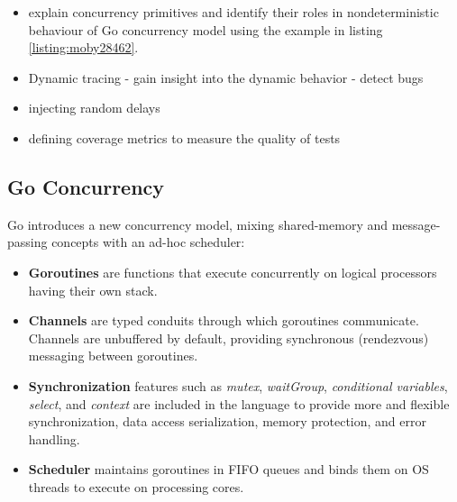 
\begin{itemize}
  \item explain concurrency primitives and identify their roles in nondeterministic behaviour of Go concurrency model using the example in listing \ref{listing:moby28462}.
  \item Dynamic tracing - gain insight into the dynamic behavior - detect bugs
  \item injecting random delays
  \item defining coverage metrics to measure the quality of tests
\end{itemize}

\subsection{Go Concurrency}
%
Go introduces a new concurrency model, mixing shared-memory and message-passing concepts with an ad-hoc scheduler:
\begin{itemize}
    \item \textbf{Goroutines} are functions that execute concurrently on logical processors having their own stack.
    \item \textbf{Channels} are typed conduits through which goroutines communicate.  Channels are unbuffered by default, providing synchronous (rendezvous) messaging between goroutines.
    \item \textbf{Synchronization} features such as \textit{mutex}, \textit{waitGroup}, \textit{conditional variables}, \textit{select}, and \textit{context} are included in the language to provide more and flexible synchronization, data access serialization, memory protection, and error handling.
    \item \textbf{Scheduler} maintains goroutines in FIFO queues and binds them on OS threads to execute on processing cores.
\end{itemize}


